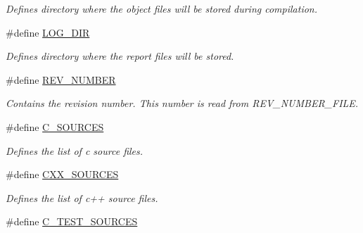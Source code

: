 \begin{DoxyCompactItemize}
\begin{DoxyCompactList}\small\item\em Defines directory where the object files will be stored during compilation. \end{DoxyCompactList}\item 
\hypertarget{group___automatic___variables_gacd4d3023d24d5314b895981b17825666}{\#define \hyperlink{group___automatic___variables_gacd4d3023d24d5314b895981b17825666}{L\+O\+G\+\_\+\+D\+I\+R}}\label{group___automatic___variables_gacd4d3023d24d5314b895981b17825666}

\begin{DoxyCompactList}\small\item\em Defines directory where the report files will be stored. \end{DoxyCompactList}\item 
\hypertarget{group___automatic___variables_gaeb1e240a5017a152cb83d53ef5b7ab6f}{\#define \hyperlink{group___automatic___variables_gaeb1e240a5017a152cb83d53ef5b7ab6f}{R\+E\+V\+\_\+\+N\+U\+M\+B\+E\+R}}\label{group___automatic___variables_gaeb1e240a5017a152cb83d53ef5b7ab6f}

\begin{DoxyCompactList}\small\item\em Contains the revision number. This number is read from R\+E\+V\+\_\+\+N\+U\+M\+B\+E\+R\+\_\+\+F\+I\+L\+E. \end{DoxyCompactList}\item 
\hypertarget{group___automatic___variables_gac64971050f0b554124e183aa13f22caa}{\#define \hyperlink{group___automatic___variables_gac64971050f0b554124e183aa13f22caa}{C\+\_\+\+S\+O\+U\+R\+C\+E\+S}}\label{group___automatic___variables_gac64971050f0b554124e183aa13f22caa}

\begin{DoxyCompactList}\small\item\em Defines the list of c source files. \end{DoxyCompactList}\item 
\hypertarget{group___automatic___variables_ga8b7fa1d8593b0d2c64abdcfcbda9495b}{\#define \hyperlink{group___automatic___variables_ga8b7fa1d8593b0d2c64abdcfcbda9495b}{C\+X\+X\+\_\+\+S\+O\+U\+R\+C\+E\+S}}\label{group___automatic___variables_ga8b7fa1d8593b0d2c64abdcfcbda9495b}

\begin{DoxyCompactList}\small\item\em Defines the list of c++ source files. \end{DoxyCompactList}\item 
\hypertarget{group___automatic___variables_gafd792eabc9b9a2f7c2a9f193cde29bf6}{\#define \hyperlink{group___automatic___variables_gafd792eabc9b9a2f7c2a9f193cde29bf6}{C\+\_\+\+T\+E\+S\+T\+\_\+\+S\+O\+U\+R\+C\+E\+S}}\label{group___automatic___variables_gafd792eabc9b9a2f7c2a9f193cde29bf6}


\end{DoxyCompactItemize}
